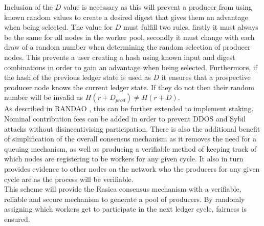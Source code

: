 Inclusion of the $D$ value is necessary as this will prevent a producer from using known random values to create a desired digest that gives them an advantage when being selected. The value for $D$ must fulfill two rules, firstly it must always be the same for all nodes in the worker pool, secondly it must change with each draw of a random number when determining the random selection of producer nodes. This prevents a user creating a hash using known input and digest combinations in order to gain an advantage when being selected. Furthermore, if the hash of the previous ledger state is used as $D$ it ensures that a prospective producer node knows the current ledger state. If they do not then their random number will be invalid as $H(r + D_{prod}) \neq H(r + D)$. \\

As described in RANDAO \cite{randao}, this can be further extended to implement staking. Nominal contribution fees can be added in order to prevent DDOS and Sybil attacks without disincentivising participation. There is also the additional benefit of simplification of the overall consensus mechanism as it removes the need for a queuing mechanism, as well as producing a verifiable method of keeping track of which nodes are registering to be workers for any given cycle. It also in turn provides evidence to other nodes on the network who the producers for any given cycle are as the process will be verifiable. \\

This scheme will provide the Rasica consensus mechanism with a verifiable, reliable and secure mechanism to generate a pool of producers. By randomly assigning which workers get to participate in the next ledger cycle, fairness is ensured. \\
